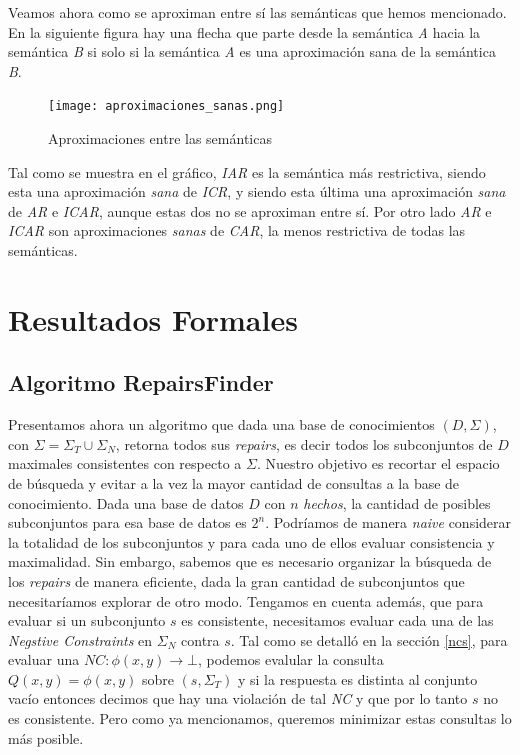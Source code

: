 \documentclass[11pt,a4paper,twoside]{tesis}
\begin{document}
Veamos ahora como se aproximan entre sí las semánticas que hemos mencionado. En la siguiente figura hay una flecha que parte desde la semántica \textit{A} hacia la semántica \textit{B} si solo si la semántica \textit{A} es una aproximación sana de la semántica \textit{B}.


\begin{figure}[ht]
    \texttt{[image: aproximaciones\_sanas.png]}
    \centering
    \caption{Aproximaciones entre las semánticas}
    \label{fig:aproximaciones}
\end{figure}

Tal como se muestra en el gráfico, \textit{IAR} es la semántica más restrictiva, siendo esta una aproximación \textit{sana} de \textit{ICR}, y siendo esta última una aproximación \textit{sana} de \textit{AR} e \textit{ICAR}, aunque estas dos no se aproximan entre sí. Por otro lado \textit{AR} e \textit{ICAR} son aproximaciones \textit{sanas} de \textit{CAR}, la menos restrictiva de todas las semánticas. 

\chapter{Resultados Formales}
\section{Algoritmo RepairsFinder}
Presentamos ahora un algoritmo que dada una base de conocimientos $(D, \Sigma)$, con $\Sigma = \Sigma_T \cup \Sigma_N$, retorna todos sus \textit{repairs}, es decir todos los subconjuntos de $D$ maximales consistentes con respecto a $\Sigma$. Nuestro objetivo es recortar el espacio de búsqueda y evitar a la vez la mayor cantidad de consultas a la base de conocimiento. Dada una base de datos $D$ con $n$ \textit{hechos}, la cantidad de posibles subconjuntos para esa base de datos es $2^n$. Podríamos de manera \textit{naive} considerar la totalidad de los subconjuntos y para cada uno de ellos evaluar consistencia y maximalidad. Sin embargo, sabemos que es necesario organizar la búsqueda de los \textit{repairs} de manera eficiente, dada la gran cantidad de subconjuntos que necesitaríamos explorar de otro modo. Tengamos en cuenta además, que para evaluar si un subconjunto $s$ es consistente, necesitamos evaluar cada una de las \textit{Negstive Constraints} en $\Sigma_N$ contra $s$. Tal como se detalló en la sección \ref{ncs}, para evaluar una $NC: \phi(x, y) \rightarrow \bot$, podemos evalular la consulta $Q(x, y) = \phi(x, y)$ sobre $(s, \Sigma_T)$ y si la respuesta es distinta al conjunto vacío entonces decimos que hay una violación de tal \textit{NC} y que por lo tanto $s$ no es consistente. Pero como ya mencionamos, queremos minimizar estas consultas lo más posible.
\end{document}

